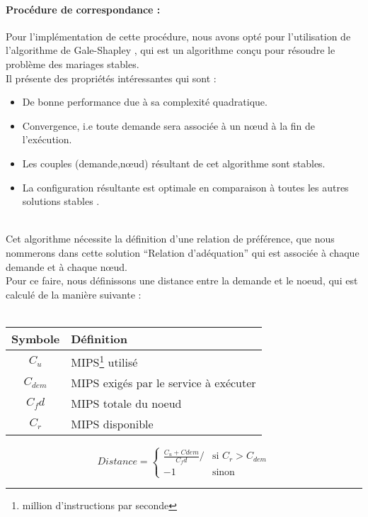 \paragraph{Procédure de correspondance :}
Pour l'implémentation de cette procédure, nous avons opté pour l'utilisation de l'algorithme de Gale-Shapley \cite{gale-shapley}, qui est un algorithme conçu pour résoudre le problème des mariages stables.\\
Il présente des propriétés intéressantes qui sont :
\begin{itemize}
    \item De bonne performance due à sa complexité quadratique.
    \item Convergence, i.e toute demande sera associée à un nœud à la fin de l'exécution.
    \item Les couples (demande,nœud) résultant de cet algorithme sont stables.
    \item La configuration résultante est optimale en comparaison à toutes les autres solutions stables \cite{gale-shapley}.
\end{itemize} \\
Cet algorithme nécessite la définition d'une relation de préférence, que nous nommerons dans cette solution “Relation d'adéquation” qui est associée à chaque demande et à chaque nœud. \\
Pour ce faire, nous définissons une distance entre la demande et le noeud, qui est calculé de la manière suivante :
\\ \\
\begin{minipage}[t]{0.4\textwidth}
\begin{flushleft}
    \begin{tabular}{| c | p{4cm}|}
    \hline
    Symbole & Définition \\
    \hline
    $C_u$ & MIPS\footnote{million d'instructions par seconde} utilisé \\ 
    \hline
    $C_{dem}$ & MIPS exigés par le service à exécuter \\
    \hline
    $C_fd$ & MIPS totale du noeud \\
    \hline
    $C_r$ & MIPS disponible \\
    \hline
    \end{tabular}
\end{flushleft}
\end{minipage}
%
\begin{minipage}[th]{0.4\textwidth}
\begin{flushright} 
\begin{center}
    $$Distance =\left \lbrace 
    \begin{array}{ll}
        \frac{C_u + Cdem}{C_fd}/ & \mbox{si $C_r > C_{dem}$}\\
        -1 & \mbox{sinon}
    \end{array}
\right.$$
\end{center}
\end{flushright}
\end{minipage}
